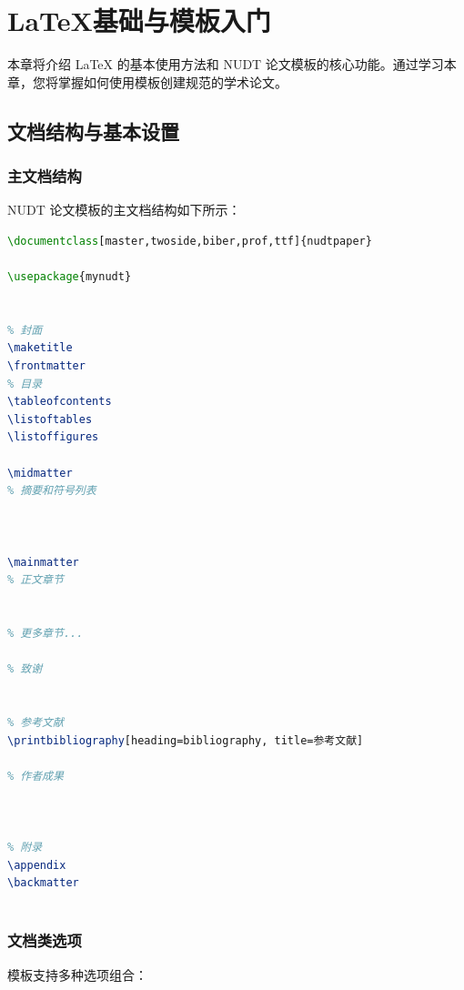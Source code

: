 \chapter{LaTeX基础与模板入门}
\label{chap:intro}

本章将介绍 LaTeX 的基本使用方法和 NUDT 论文模板的核心功能。通过学习本章，您将掌握如何使用模板创建规范的学术论文。

\section{文档结构与基本设置}
\label{sec:structure}

\subsection{主文档结构}
NUDT 论文模板的主文档结构如下所示：

\begin{lstlisting}[language=TeX, caption=主文档基本结构]
\documentclass[master,twoside,biber,prof,ttf]{nudtpaper}

\usepackage{mynudt}


% 封面
\maketitle
\frontmatter
% 目录
\tableofcontents
\listoftables
\listoffigures

\midmatter
% 摘要和符号列表



\mainmatter
% 正文章节


% 更多章节...

% 致谢


% 参考文献
\printbibliography[heading=bibliography, title=参考文献]

% 作者成果



% 附录
\appendix
\backmatter



\end{lstlisting}

\subsection{文档类选项}
模板支持多种选项组合：

